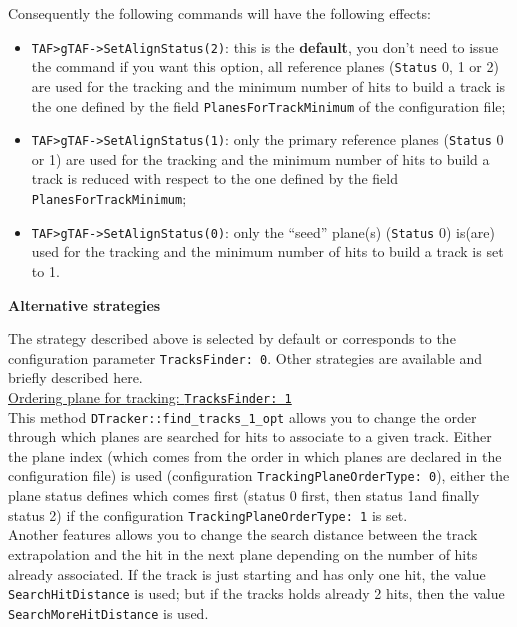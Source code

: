 \documentclass[a4paper, 12pt, twoside]{article}
\begin{document}
\noindent
Consequently the following commands will have the following effects:
\begin{itemize}
\item {\tt TAF>gTAF->SetAlignStatus(2)}: this is the {\bf default}, you don't need to issue the command if you want this option, all reference planes ({\tt Status} 0, 1 or 2) are used for the tracking and the minimum number of hits to build a track is the one defined by the field {\tt PlanesForTrackMinimum} of the configuration file;
\item {\tt TAF>gTAF->SetAlignStatus(1)}:  only the primary reference planes ({\tt Status} 0 or 1) are used for the tracking and the minimum number of hits to build a track is reduced with respect to the one defined by the field {\tt PlanesForTrackMinimum};
\item {\tt TAF>gTAF->SetAlignStatus(0)}: only the ``seed'' plane(s) ({\tt Status} 0) is(are) used for the tracking and the minimum number of hits to build a track is set to 1. 
\end{itemize}

\vspace{.8 cm}

\noindent
{\bf Alternative strategies}

\noindent
The strategy described above is selected by default or corresponds to the configuration parameter {\tt TracksFinder: 0}. Other strategies are available and briefly described here.\\

\noindent
\hspace{1cm} \underline{Ordering plane for tracking: {\tt TracksFinder: 1}}\\
\noindent
This method {\tt DTracker::find\_tracks\_1\_opt} allows you to change the order through which planes are searched for hits to associate to a given track. Either the plane index (which comes from the order in which planes are declared in the configuration file) is used (configuration {\tt TrackingPlaneOrderType: 0}), either the plane status defines which comes first (status 0 first, then status 1and finally status 2) if the configuration {\tt TrackingPlaneOrderType: 1} is set.\\
Another features allows you to change the search distance between the track extrapolation and the hit in the next plane depending on the number of hits already associated. If the track is just starting and has only one hit, the value {\tt SearchHitDistance} is used; but if the tracks holds already 2 hits, then the value {\tt SearchMoreHitDistance} is used.\\
\end{document}
